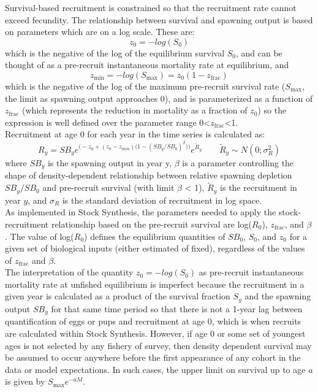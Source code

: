 \begin{description}
	Survival-based recruitment is constrained so that the recruitment rate cannot exceed fecundity. The relationship between survival and spawning output is based on parameters which are on a log scale. These are:
	\begin{equation}
		z_0=-log(S_0)
	\end{equation} 
	which is the negative of the log of the equilibrium survival $S_0$, and can be thought of as a pre-recruit instantaneous mortality rate at equilibrium, and
	\begin{equation}
		z_{\text{min}}=-log(S_{\text{max}})=z_0(1-z_{\text{frac}})
	\end{equation}
	which is the negative of the log of the maximum pre-recruit survival rate ($S_{\text{max}}$, the limit as spawning output approaches 0), and is parameterized as a function of $z_{\text{frac}}$ (which represents the reduction in mortality as a fraction of $z_0$) so the expression is well defined over the parameter range 0<$z_{\text{frac}}$<1.\\
	
	Recruitment at age 0 for each year in the time series is calculated as:
	\begin{equation}{ R_y = SB_ye^{\Big(-z_0 + (z_0-z_{min})\big(1-(SB_y/SB_0)^\beta \big)\Big)}e^{\tilde{R}_y}\qquad  \tilde{R}_y\sim N(0;\sigma^2_R)}
	\end{equation}
	where $SB_y$ is the spawning output in year y,  $\beta$ is a parameter controlling the shape of density-dependent relationship between relative spawning depletion $SB_y/SB_0$ and pre-recruit survival (with limit $\beta$ < 1), $\tilde{R}_y$ is the recruitment in year $y$, and $\sigma_R$ is the standard deviation of recruitment in log space. \\
	
	As implemented in Stock Synthesis, the parameters needed to apply the stock-recruitment relationship based on the pre-recruit survival are log($R_0$), $z_{\text{frac}}$, and $\beta$. The value of log($R_0$) defines the equilibrium quantities of $SB_0$, $S_0$, and $z_0$ for a given set of biological inputs (either estimated of fixed), regardless of the values of $z_{\text{frac}}$ and $\beta$.\\
	
	The interpretation of the quantity $z_0=-log(S_0)$ as pre-recruit instantaneous mortality rate at unfished equilibrium is imperfect because the recruitment in a given year is calculated as a product of the survival fraction $S_y$ and the spawning output $SB_y$ for that same time period so that there is not a 1-year lag between quantification of eggs or pups and recruitment at age 0, which is when recruits are calculated within Stock Synthesis. However, if age 0 or some set of youngest ages is not selected by any fishery of survey, then density dependent survival may be assumed to occur anywhere before the first appearance of any cohort in the data or model expectations. In such cases, the upper limit on survival up to age $a$ is given by $S_{\text{max}}e^{-aM}$. \\
	

\end{description}
